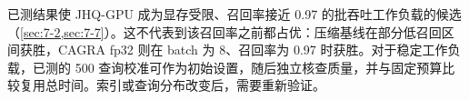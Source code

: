 已测结果使 JHQ-GPU 成为显存受限、召回率接近 0.97 的批吞吐工作负载的候选（\cref{sec:7-2,sec:7-7}）。这不代表到该召回率之前都占优：压缩基线在部分低召回区间获胜，CAGRA fp32 则在 batch 为 8、召回率为 0.97 时获胜。对于稳定工作负载，已测的 500 查询校准可作为初始设置，随后独立核查质量，并与固定预算比较复用总时间。索引或查询分布改变后，需要重新验证。
